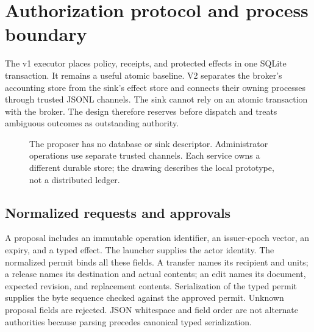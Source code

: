 \section{Authorization protocol and process boundary}
\label{sec:v2protocol}
The v1 executor places policy, receipts, and protected effects in one SQLite
transaction. It remains a useful atomic baseline. V2 separates the broker's
accounting store from the sink's effect store and connects their owning
processes through trusted JSONL channels. The sink cannot rely on an atomic
transaction with the broker. The design therefore reserves before dispatch and
treats ambiguous outcomes as outstanding authority.

\begin{figure}[t]\centering
{}
\caption{The proposer has no database or sink descriptor. Administrator
operations use separate trusted channels. Each service owns a different durable
store; the drawing describes the local prototype, not a distributed ledger.}
\label{fig:v2boundary}\end{figure}

\subsection{Normalized requests and approvals}
A proposal includes an immutable operation identifier, an issuer-epoch vector,
an expiry, and a typed effect. The launcher supplies the actor identity. The
normalized permit binds all these fields. A transfer names its recipient and
units; a release names its destination and actual contents; an edit names its
document, expected revision, and replacement contents. Serialization of the typed
permit supplies the byte sequence checked against the approved permit. Unknown
proposal fields are rejected. JSON whitespace and field order are not alternate
authorities because parsing precedes canonical typed serialization.

